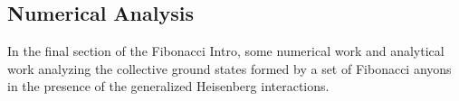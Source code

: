 \documentclass[preprint, 5p, authoryear, 12pt]{elsarticle}
\theoremstyle{plain}
\begin{document}
\subsection{Numerical Analysis}
In the final section of the Fibonacci Intro, some numerical work and analytical work
analyzing the collective ground states formed by a set of Fibonacci anyons in the presence of the generalized Heisenberg interactions. 



\end{document}
